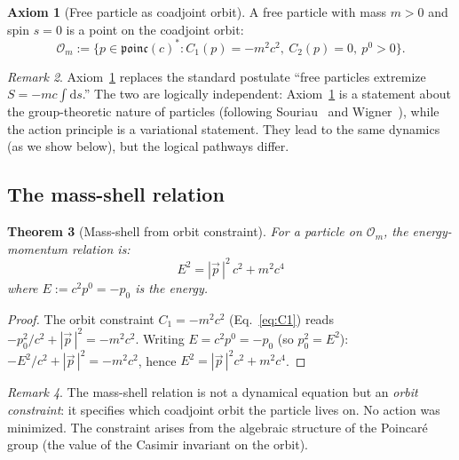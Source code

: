 \documentclass[12pt]{article}
\theoremstyle{plain}
\newtheorem{theorem}{Theorem}[section]
\theoremstyle{definition}
\newtheorem{axiom}[theorem]{Axiom}
\theoremstyle{remark}
\newtheorem{remark}[theorem]{Remark}
\newcommand{\dd}{\mathrm{d}}
\begin{document}
\begin{axiom}[Free particle as coadjoint orbit]\label{ax:particle}
A free particle with mass $m > 0$ and spin $s = 0$ is a point on the coadjoint orbit:
\begin{equation}
\mathcal{O}_{m} := \{p \in \mathfrak{poinc}(c)^* : C_1(p) = -m^2c^2,\ C_2(p) = 0,\ p^0 > 0\}.
\end{equation}
\end{axiom}

\begin{remark}
Axiom~\ref{ax:particle} replaces the standard postulate ``free particles extremize $S = -mc\int\dd s$.'' The two are logically independent: Axiom~\ref{ax:particle} is a statement about the group-theoretic nature of particles (following Souriau~\cite{souriau1970} and Wigner~\cite{wigner1939}), while the action principle is a variational statement. They lead to the same dynamics (as we show below), but the logical pathways differ.
\end{remark}

\subsection{The mass-shell relation}

\begin{theorem}[Mass-shell from orbit constraint]\label{thm:mass-shell}
For a particle on $\mathcal{O}_m$, the energy-momentum relation is:
\begin{equation}\label{eq:mass-shell}
\boxed{E^2 = |\vec{p}\,|^2\,c^2 + m^2c^4}
\end{equation}
where $E := c^2 p^0 = -p_0$ is the energy.
\end{theorem}

\begin{proof}
The orbit constraint $C_1 = -m^2c^2$ (Eq.~\eqref{eq:C1}) reads $-p_0^2/c^2 + |\vec{p}\,|^2 = -m^2c^2$. Writing $E = c^2 p^0 = -p_0$ (so $p_0^2 = E^2$): $-E^2/c^2 + |\vec{p}\,|^2 = -m^2c^2$, hence $E^2 = |\vec{p}\,|^2c^2 + m^2c^4$.
\end{proof}

\begin{remark}
The mass-shell relation is not a dynamical equation but an \emph{orbit constraint}: it specifies which coadjoint orbit the particle lives on. No action was minimized. The constraint arises from the algebraic structure of the Poincar\'e group (the value of the Casimir invariant on the orbit).
\end{remark}
\end{document}
